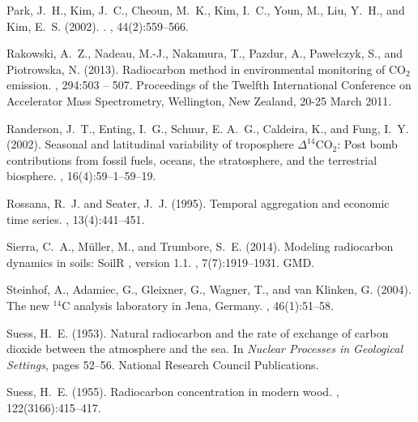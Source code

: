 \documentclass[a4paper, 11pt]{article}
\begin{document}
\begin{thebibliography}{}
Park, J.~H., Kim, J.~C., Cheoun, M.~K., Kim, I.~C., Youn, M., Liu, Y.~H., and
  Kim, E.~S. (2002).
.
, 44(2):559--566.

Rakowski, A.~Z., Nadeau, M.-J., Nakamura, T., Pazdur, A., Pawe{\l}czyk, S., and
  Piotrowska, N. (2013).
\newblock Radiocarbon method in environmental monitoring of {CO$_2$} emission.
, 294:503 -- 507.
\newblock Proceedings of the Twelfth International Conference on Accelerator
  Mass Spectrometry, Wellington, New Zealand, 20-25 March 2011.

Randerson, J.~T., Enting, I.~G., Schuur, E. A.~G., Caldeira, K., and Fung,
  I.~Y. (2002).
\newblock Seasonal and latitudinal variability of troposphere
  {$\Delta^{14}$CO$_2$}: Post bomb contributions from fossil fuels, oceans, the
  stratosphere, and the terrestrial biosphere.
, 16(4):59--1--59--19.

Rossana, R.~J. and Seater, J.~J. (1995).
\newblock Temporal aggregation and economic time series.
, 13(4):441--451.

Sierra, C.~A., M\"uller, M., and Trumbore, S.~E. (2014).
\newblock Modeling radiocarbon dynamics in soils: {SoilR} , version 1.1.
, 7(7):1919--1931.
\newblock GMD.

Steinhof, A., Adamiec, G., Gleixner, G., Wagner, T., and van Klinken, G.
  (2004).
\newblock The new {$^{14}$C} analysis laboratory in {Jena, Germany}.
, 46(1):51--58.

Suess, H.~E. (1953).
\newblock Natural radiocarbon and the rate of exchange of carbon dioxide
  between the atmosphere and the sea.
\newblock In {\em Nuclear Processes in Geological Settings}, pages 52--56.
  National Research Council Publications.

Suess, H.~E. (1955).
\newblock Radiocarbon concentration in modern wood.
, 122(3166):415--417.


\end{thebibliography}
\end{document}
